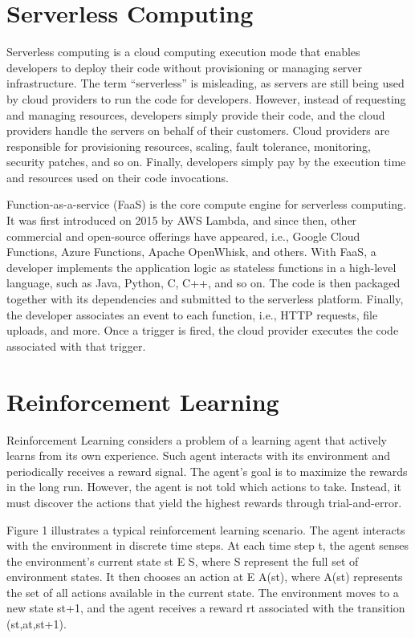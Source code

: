 \section{Serverless Computing}

Serverless computing is a cloud computing execution mode that enables developers to deploy their code without provisioning or managing server infrastructure. The term “serverless” is misleading, as servers are still being used by cloud providers to run the code for developers. However, instead of requesting and managing resources, developers simply provide their code, and the cloud providers handle the servers on behalf of their customers. Cloud providers are responsible for provisioning resources, scaling, fault tolerance, monitoring, security patches, and so on. Finally, developers simply pay by the execution time and resources used on their code invocations.

Function-as-a-service (FaaS) is the core compute engine for serverless computing. It was first introduced on 2015 by AWS Lambda, and since then, other commercial and open-source offerings have appeared, i.e., Google Cloud Functions, Azure Functions, Apache OpenWhisk, and others. With FaaS, a developer implements the application logic as stateless functions in a high-level language, such as Java, Python, C, C++, and so on. The code is then packaged together with its dependencies and submitted to the serverless platform. Finally, the developer associates an event to each function, i.e., HTTP requests, file uploads, and more. Once a trigger is fired, the cloud provider executes the code associated with that trigger.

\section{Reinforcement Learning}

Reinforcement Learning considers a problem of a learning agent that actively learns from its own experience. Such agent interacts with its environment and periodically receives a reward signal. The agent’s goal is to maximize the rewards in the long run. However, the agent is not told which actions to take. Instead, it must discover the actions that yield the highest rewards through trial-and-error.

Figure 1 illustrates a typical reinforcement learning scenario. The agent interacts with the environment in discrete time steps. At each time step t, the agent senses the environment’s current state st E S, where S represent the full set of environment states. It then chooses an action at E A(st), where A(st) represents the set of all actions available in the current state. The environment moves to a new state st+1, and the agent receives a reward rt associated with the transition (st,at,st+1).

